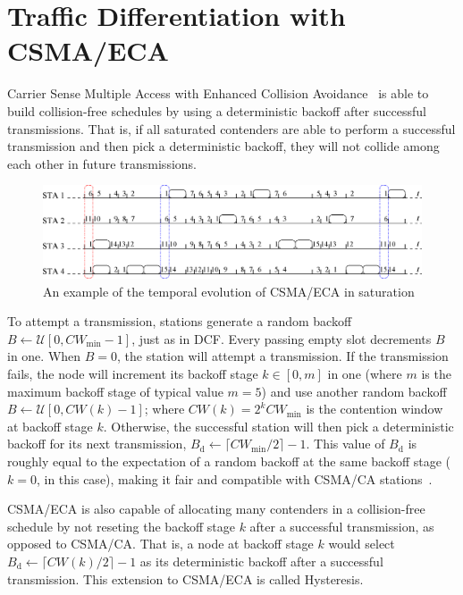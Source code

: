\section{Traffic Differentiation with CSMA/ECA}\label{section3}
Carrier Sense Multiple Access with Enhanced Collision Avoidance~\cite{sanabria2014high, research2standards} is able to build collision-free schedules by using a deterministic backoff after successful transmissions. That is, if all saturated contenders are able to perform a successful transmission and then pick a deterministic backoff, they will not collide among each other in future transmissions.

	\begin{figure}[tb]
	\centering
		\includegraphics[width=0.8\linewidth]{figures/csma_eca_different_backoff_short.eps}
		\caption{An example of the temporal evolution of CSMA/ECA in saturation}
		\label{fig:ECA}
	\end{figure}
	
To attempt a transmission, stations generate a random backoff $B\leftarrow\mathcal{U}[0,CW_{\min}-1]$, just as in DCF. Every passing empty slot decrements $B$ in one. When $B=0$, the station will attempt a transmission. If the transmission fails, the node will increment its backoff stage $k\in[0,m]$ in one (where $m$ is the maximum backoff stage of typical value $m=5$) and use another random backoff $B\leftarrow\mathcal{U}[0,CW(k)-1]$; where $CW(k)=2^{k}CW_{\min}$ is the contention window at backoff stage $k$. Otherwise, the successful station will then pick a deterministic backoff for its next transmission, $B_{\text{d}}\leftarrow \lceil CW_{\min}/2\rceil-1$. This value of $B_{\text{d}}$ is roughly equal to the expectation of a random backoff at the same backoff stage ($k=0$, in this case), making it fair and compatible with CSMA/CA stations~\cite{research2standards}.

CSMA/ECA is also capable of allocating many contenders in a collision-free schedule by not reseting the backoff stage $k$ after a successful transmission, as opposed to CSMA/CA. That is, a node at backoff stage $k$ would select $B_{\text{d}}\leftarrow \lceil CW(k)/2\rceil-1$ as its deterministic backoff after a successful transmission. This extension to CSMA/ECA is called Hysteresis. 

